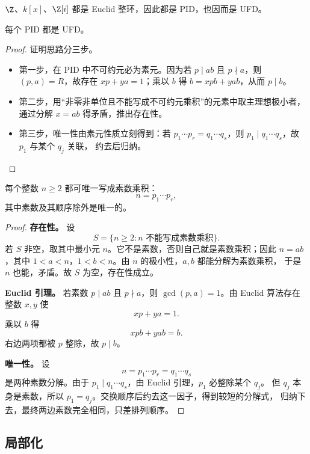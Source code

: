 \begin{example}
$\Z$、$k[x]$、$\Z[i]$ 都是 Euclid 整环，因此都是 PID，也因而是 UFD。
\end{example}

\begin{proposition}
每个 PID 都是 UFD。
\end{proposition}

\begin{proof}
证明思路分三步。
\begin{itemize}
  \item 第一步，在 PID 中不可约元必为素元。因为若 $p\mid ab$ 且 $p\nmid a$，则 $(p,a)=R$，故存在
  $xp+ya=1$；乘以 $b$ 得 $b=xpb+yab$，从而 $p\mid b$。
  \item 第二步，用“非零非单位且不能写成不可约元乘积”的元素中取主理想极小者，
  通过分解 $x=ab$ 得矛盾，推出存在性。
  \item 第三步，唯一性由素元性质立刻得到：若
  $p_1\cdots p_r=q_1\cdots q_s$，则 $p_1\mid q_1\cdots q_s$，故 $p_1$ 与某个 $q_j$ 关联，
  约去后归纳。
\end{itemize}
\end{proof}

\begin{theorem}[$\Z$ 中的算术基本定理]
每个整数 $n\ge 2$ 都可唯一写成素数乘积：
\begin{equation}
  n=p_1\cdots p_r,
\end{equation}
其中素数及其顺序除外是唯一的。
\end{theorem}

\begin{proof}
\textbf{存在性。}
设
\[
  S=\{n\ge 2: n\text{ 不能写成素数乘积}\}.
\]
若 $S$ 非空，取其中最小元 $n$。它不是素数，否则自己就是素数乘积；因此
$n=ab$，其中 $1<a<n$，$1<b<n$。由 $n$ 的极小性，$a,b$ 都能分解为素数乘积，
于是 $n$ 也能，矛盾。故 $S$ 为空，存在性成立。

\textbf{Euclid 引理。}
若素数 $p\mid ab$ 且 $p\nmid a$，则 $\gcd(p,a)=1$。由 Euclid 算法存在整数 $x,y$ 使
\[
  xp+ya=1.
\]
乘以 $b$ 得
\[
  xpb+yab=b.
\]
右边两项都被 $p$ 整除，故 $p\mid b$。

\textbf{唯一性。}
设
\[
  n=p_1\cdots p_r=q_1\cdots q_s
\]
是两种素数分解。由于 $p_1\mid q_1\cdots q_s$，由 Euclid 引理，$p_1$ 必整除某个 $q_j$。
但 $q_j$ 本身是素数，所以 $p_1=q_j$。交换顺序后约去这一因子，得到较短的分解式，
归纳下去，最终两边素数完全相同，只差排列顺序。
\end{proof}

\subsection{局部化}

